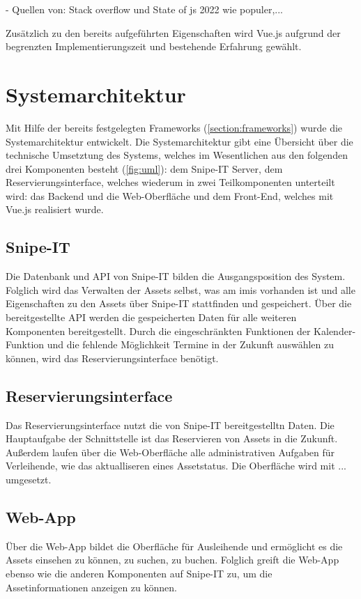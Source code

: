 - Quellen von: Stack overflow und State of js 2022 wie populer,...

Zusätzlich zu den bereits aufgeführten Eigenschaften wird Vue.js aufgrund der
begrenzten Implementierungszeit und bestehende Erfahrung gewählt.

\section{Systemarchitektur}
Mit Hilfe der bereits festgelegten Frameworks (\ref{section:frameworks}) wurde
die Systemarchitektur entwickelt. Die Systemarchitektur gibt eine Übersicht über
die technische Umsetztung des Systems, welches im Wesentlichen aus den folgenden
drei Komponenten besteht (\ref{fig:uml}): dem Snipe-IT Server, dem
Reservierungsinterface, welches wiederum in zwei Teilkomponenten unterteilt
wird: das Backend und die Web-Oberfläche und dem Front-End, welches mit Vue.js
realisiert wurde.

\subsection{Snipe-IT}
Die Datenbank und API von Snipe-IT bilden die Ausgangsposition des System.
Folglich wird das Verwalten der Assets selbst, was am \ac{imis} vorhanden ist
und alle Eigenschaften zu den Assets über Snipe-IT stattfinden und gespeichert.
Über die bereitgestellte API werden die gespeicherten Daten für alle weiteren
Komponenten bereitgestellt. Durch die eingeschränkten Funktionen der
Kalender-Funktion und die fehlende Möglichkeit Termine in der Zukunft auswählen
zu können, wird das Reservierungsinterface benötigt.

\subsection{Reservierungsinterface}
Das Reservierungsinterface nutzt die von Snipe-IT bereitgestelltn Daten. Die
Hauptaufgabe der Schnittstelle ist das Reservieren von Assets in die Zukunft.
Außerdem laufen über die Web-Oberfläche alle administrativen Aufgaben für
Verleihende, wie das aktualliseren eines Assetstatus. Die Oberfläche wird mit
... umgesetzt.

\subsection{Web-App}
Über die Web-App bildet die Oberfläche für Ausleihende und ermöglicht es die
Assets einsehen zu können, zu suchen, zu buchen. Folglich greift die Web-App
ebenso wie die anderen Komponenten auf Snipe-IT zu, um die Assetinformationen
anzeigen zu können.

